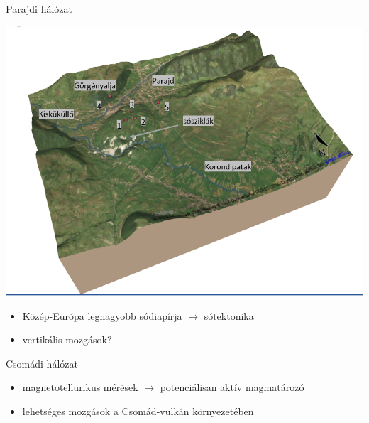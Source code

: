 \documentclass[aspectratio=169]{beamer}
\begin{document}
\begin{frame}{Parajdi hálózat}
    \begin{minipage}[c]{0.7\textwidth}
        \includegraphics[width=\textwidth]{parajd_3D.png}
    \end{minipage}
    \hspace{5pt}
    \begin{minipage}[c]{0.225\textwidth}
        \begin{itemize}
            \item Közép-Európa legnagyobb sódiapírja $\rightarrow$ sótektonika
            \item vertikális mozgások?
        \end{itemize}
    \end{minipage}
\end{frame}


\begin{frame}{Csomádi hálózat}
    \begin{minipage}[c]{0.475\textwidth}
        \centering
        \csomad
    \end{minipage}
    \hspace{5pt}
    \begin{minipage}[c]{0.45\textwidth}
        \begin{itemize}
            \item magnetotellurikus mérések $\rightarrow$ potenciálisan aktív magmatározó
            \item lehetséges mozgások a Csomád-vulkán környezetében
        \end{itemize}
    \end{minipage}
\end{frame}

\backupend
\end{document}
